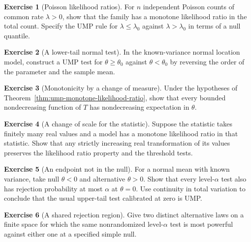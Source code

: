 \documentclass[11pt,oneside]{book}
\theoremstyle{definition}
\newtheorem{exercise}{Exercise}[section]
\theoremstyle{remark}
\begin{document}
\begin{exercise}[Poisson likelihood ratios]
\label{exer:np-poisson-mlr}
For $n$ independent Poisson counts of common rate $\lambda>0$,
show that the family has a monotone likelihood ratio in the
total count. Specify the UMP rule for $\lambda\leq\lambda_0$
against $\lambda>\lambda_0$ in terms of a null quantile.
\end{exercise}

\begin{exercise}[A lower-tail normal test]
\label{exer:np-normal-lower-tail}
In the known-variance normal location model, construct a UMP
test for $\theta\geq\theta_0$ against $\theta<\theta_0$ by
reversing the order of the parameter and the sample mean.
\end{exercise}

\begin{exercise}[Monotonicity by a change of measure]
\label{exer:np-monotone-power-functions}
Under the hypotheses of Theorem~\ref{thm:ump-monotone-likelihood-ratio},
show that every bounded nondecreasing function of $T$ has
nondecreasing expectation in $\theta$.
\end{exercise}

\begin{exercise}[A change of scale for the statistic]
\label{exer:np-mlr-increasing-transform}
Suppose the statistic takes finitely many real values and a model
has a monotone likelihood ratio in that statistic. Show that any
strictly increasing real transformation of its values preserves
the likelihood ratio property and the threshold tests.
\end{exercise}

\begin{exercise}[An endpoint not in the null]
\label{exer:np-open-normal-null}
For a normal mean with known variance, take null $\theta<0$
and alternative $\theta>0$. Show that every level-$\alpha$
test also has rejection probability at most $\alpha$ at $\theta=0$.
Use continuity in total variation to conclude that the usual
upper-tail test calibrated at zero is UMP.
\end{exercise}

\begin{exercise}[A shared rejection region]
\label{exer:np-common-region-different-ratios}
Give two distinct alternative laws on a finite space for which
the same nonrandomized level-$\alpha$ test is most powerful
against either one at a specified simple null.
\end{exercise}
\end{document}
